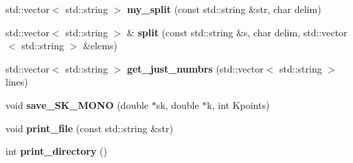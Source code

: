 \begin{DoxyCompactItemize}
\item 
std\+::vector$<$ std\+::string $>$ {\bfseries my\+\_\+split} (const std\+::string \&str, char delim)\hypertarget{class_file___manage_af9137339f79aaac3f9e5aa398364b625}{}\label{class_file___manage_af9137339f79aaac3f9e5aa398364b625}

\item 
std\+::vector$<$ std\+::string $>$ \& {\bfseries split} (const std\+::string \&s, char delim, std\+::vector$<$ std\+::string $>$ \&elems)\hypertarget{class_file___manage_a1611614dd81969a1722a91178e5b4787}{}\label{class_file___manage_a1611614dd81969a1722a91178e5b4787}

\item 
std\+::vector$<$ std\+::string $>$ {\bfseries get\+\_\+just\+\_\+numbrs} (std\+::vector$<$ std\+::string $>$lines)\hypertarget{class_file___manage_afc1e5a4741aab41c324cea922cc975fc}{}\label{class_file___manage_afc1e5a4741aab41c324cea922cc975fc}

\item 
void {\bfseries save\+\_\+\+S\+K\+\_\+\+M\+O\+NO} (double $\ast$sk, double $\ast$k, int Kpoints)\hypertarget{class_file___manage_abb0a79ecc1c74608831544a979e3f931}{}\label{class_file___manage_abb0a79ecc1c74608831544a979e3f931}

\item 
void {\bfseries print\+\_\+file} (const std\+::string \&str)\hypertarget{class_file___manage_ab8161cc5685ac0347078f62dd816a4bc}{}\label{class_file___manage_ab8161cc5685ac0347078f62dd816a4bc}

\item 
int {\bfseries print\+\_\+directory} ()\hypertarget{class_file___manage_ada7d3f8c329658f0a234f87c194ca0cb}{}\label{class_file___manage_ada7d3f8c329658f0a234f87c194ca0cb}

\end{DoxyCompactItemize}
